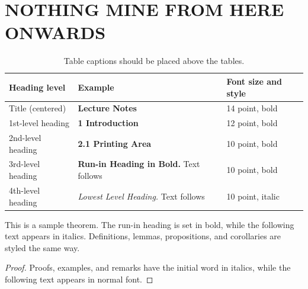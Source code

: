 \documentclass[runningheads]{llncs}
\begin{document}
\section{NOTHING MINE FROM HERE ONWARDS}

\begin{table}
\caption{Table captions should be placed above the
tables.}\label{tab1}
\begin{tabular}{|l|l|l|}
\hline
Heading level &  Example & Font size and style\\
\hline
Title (centered) &  {\Large\bfseries Lecture Notes} & 14 point, bold\\
1st-level heading &  {\large\bfseries 1 Introduction} & 12 point, bold\\
2nd-level heading & {\bfseries 2.1 Printing Area} & 10 point, bold\\
3rd-level heading & {\bfseries Run-in Heading in Bold.} Text follows & 10 point, bold\\
4th-level heading & {\itshape Lowest Level Heading.} Text follows & 10 point, italic\\
\hline
\end{tabular}
\end{table}





\begin{theorem}
This is a sample theorem. The run-in heading is set in bold, while
the following text appears in italics. Definitions, lemmas,
propositions, and corollaries are styled the same way.
\end{theorem}
%
%
\begin{proof}
Proofs, examples, and remarks have the initial word in italics,
while the following text appears in normal font.
\end{proof}
\end{document}
